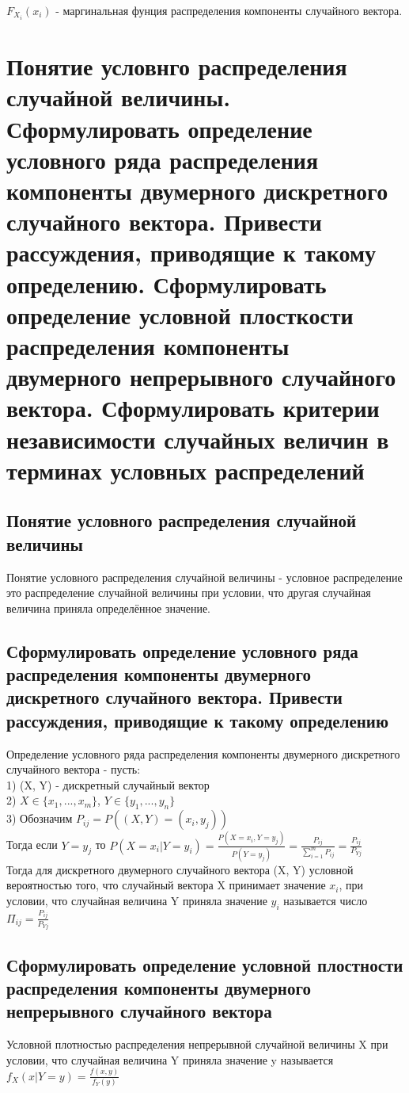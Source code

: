 $F_{X_{i}}(x_{i})$ - маргинальная фунция распределения компоненты случайного вектора.\\

\section{Понятие условнго распределения случайной величины. Сформулировать определение условного ряда распределения компоненты двумерного дискретного случайного вектора. Привести рассуждения, приводящие к такому определению. Сформулировать определение условной плосткости распределения компоненты двумерного непрерывного случайного вектора. Сформулировать критерии независимости случайных величин в терминах условных распределений}
\subsection{Понятие условного распределения случайной величины}
Понятие условного распределения случайной величины - условное распределение это распределение случайной величины при условии, что другая случайная величина приняла определённое значение.

\subsection{Сформулировать определение условного ряда распределения компоненты двумерного дискретного случайного вектора. Привести рассуждения, приводящие к такому определению}
Определение условного ряда распределения компоненты двумерного дискретного случайного вектора - пусть:\\
1) (X, Y) - дискретный случайный вектор\\
2) $X \in \{x_{1}, ..., x_{m}\}$, $Y \in \{y_{1}, ..., y_{n}\}$\\
3) Обозначим $P_{ij} = P((X, Y) = (x_{i}, y_{j}))$\\
Тогда если $Y = y_{j}$ то $P(X = x_{i}|Y = y_{i}) = \frac{P(X = x_{i}, Y = y_{j})}{P(Y = y_{j})} = \frac{P_{ij}}{\sum\limits^{m}_{i = 1}P_{ij}} = \frac{P_{ij}}{P_{Yj}}$\\
Тогда для дискретного двумерного случайного вектора (X, Y) условной вероятностью того, что случайный вектора X принимает значение $x_{i}$, при условии, что случайная величина Y приняла значение $y_{i}$ называется число $\Pi_{ij} = \frac{P_{ij}}{P_{Yj}}$\\

\subsection{Сформулировать определение условной плостности распределения компоненты двумерного непрерывного случайного вектора}
Условной плотностью распределения непрерывной случайной величины X при условии, что случайная величина Y приняла значение y называется $f_{X}(x | Y = y) = \frac{f(x, y)}{f_{Y}(y)}$\\


